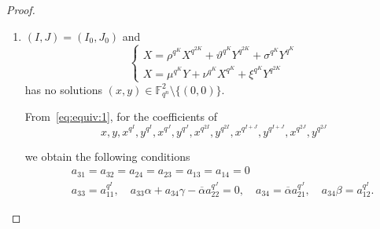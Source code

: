 \documentclass[11pt]{article}
\theoremstyle{definition}
\numberwithin{equation}{section}
\begin{document}
\begin{proof}
\begin{enumerate}
\begin{itemize}
\begin{itemize}
\item \textbf{Subcase} $J = I + J_0$.
Considering the coefficients of $x$, $ y $, $x^{q^J}$, $ y ^{q^J}$,  $x^{q^{J+J_0}}$, $ y ^{q^{J+J_0}}$, we get
$a_{31} = a_{32} = a_{33} = a_{34} = 0$. 

\item \textbf{Subcase} $J = 2I$ and $J_0\neq 3I$.
Considering the coefficients of $x$, $ y $, $x^{q^J}$, $ y ^{q^J}$,  $x^{q^{I+J}}$, $ y ^{q^{I+J}}$, we get
$a_{31} = a_{32} = a_{33} = a_{34} = 0$.

\item \textbf{Subcase} $J = 2I$ and $J_0= 3I$.
Considering the coefficients of $x$, $ y $, $x^{q^{5I}}$, $ y ^{q^{5I}}$,  $x^{q^{2I}}$, $ y ^{q^{2I}}$, we get
$a_{31} = a_{32} = a_{33} = a_{34} = 0$.
\end{itemize}

\end{itemize}

In all the cases listed above,  the matrix~\eqref{eq:mat:gammaell} 
is not an element of $\mathrm{GL}(4,\mathbb{F}_{q^n})$. Hence the two sets $U_{\alpha, \beta, \gamma}^{I,J,n}$ and $U_{\overline{\alpha}, \overline{\beta}, \overline{\gamma}}^{I_0,J_0,n}$ are not $\textrm{GL}(4,q^n)$-equivalent.
\item  $(I,J)= (I_0, J_0)$ and 
    $$
    \begin{cases}
    X = \rho^{q^K}X^{q^{2K}} + \vartheta^{q^K}Y^{q^{2K}} + \sigma^{q^K}Y^{q^K}\\
    X = \mu^{q^K}Y + \nu^{q^K}X^{q^K} + \xi^{q^K}Y^{q^{2K}}
    \end{cases}
    $$
    has no solutions $(x,y)\in \mathbb{F}_{q^n}^2\setminus\{(0,0)\}$.

From~\eqref{eq:equiv:1},  for the coefficients of $$x,  y , x^{q^I},  y ^{q^I}, x^{q^J},  y ^{q^J}, x^{q^{2I}},  y ^{q^{2I}}, x^{q^{I+J}},  y ^{q^{I+J}}, x^{q^{2J}},  y ^{q^{2J}}$$

we obtain the following conditions
\begin{eqnarray}
\label{system:1}
        &&a_{31} = a_{32} = a_{24} = a_{23} = a_{13} = a_{14} = 0\nonumber \\
        &&a_{33} = a_{11}^{q^I}, \quad 
        a_{33}\alpha + a_{34}\gamma - \overline{\alpha}a_{22}^{q^J} = 0, \quad 
        a_{34} = \overline{\alpha}a_{21}^{q^J}, \quad
        a_{34}\beta = a_{12}^{q^I}.
\end{eqnarray}


\end{enumerate}
\end{proof}
\end{document}
